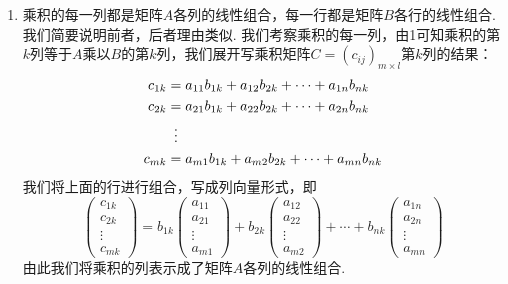 \begin{enumerate}
\begin{enumerate}
              \item 乘积的每一列都是矩阵$A$各列的线性组合，每一行都是矩阵$B$各行的线性组合. 我们简要说明前者，后者理由类似. 我们考察乘积的每一列，由1可知乘积的第$k$列等于$A$乘以$B$的第$k$列，我们展开写乘积矩阵$C=(c_{ij})_{m\times l}$第$k$列的结果：
                    \begin{align*}
                        c_{1k} & =a_{11}b_{1k}+a_{12}b_{2k}+\cdots+a_{1n}b_{nk} \\
                        c_{2k} & =a_{21}b_{1k}+a_{22}b_{2k}+\cdots+a_{2n}b_{nk} \\
                               & \vdotswithin{=}                                \\
                        c_{mk} & =a_{m1}b_{1k}+a_{m2}b_{2k}+\cdots+a_{mn}b_{nk}
                    \end{align*}
                    我们将上面的行进行组合，写成列向量形式，即
                    \[\begin{pmatrix}
                            c_{1k} \\ c_{2k} \\ \vdots \\ c_{mk}
                        \end{pmatrix}=b_{1k}\begin{pmatrix}
                            a_{11} \\ a_{21} \\ \vdots \\ a_{m1}
                        \end{pmatrix}+b_{2k}\begin{pmatrix}
                            a_{12} \\ a_{22} \\ \vdots \\ a_{m2}
                        \end{pmatrix}+\cdots+b_{nk}\begin{pmatrix}
                            a_{1n} \\ a_{2n} \\ \vdots \\ a_{mn}
                        \end{pmatrix}\]
                    由此我们将乘积的列表示成了矩阵$A$各列的线性组合.
          \end{enumerate}


\end{enumerate}
